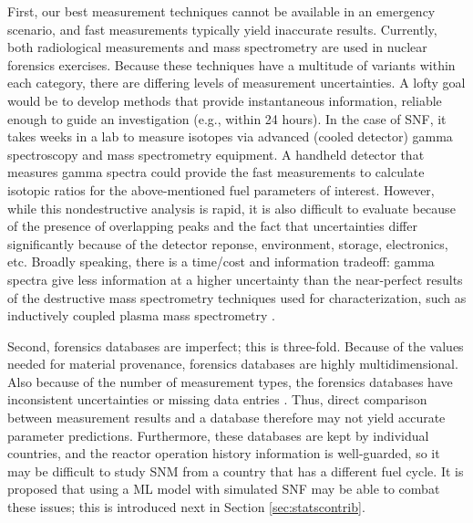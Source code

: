 First, our best measurement techniques cannot be available in an emergency
scenario, and fast measurements typically yield inaccurate results.  Currently,
both radiological measurements and mass spectrometry are used in nuclear
forensics exercises.  Because these techniques have a multitude of variants
within each category, there are differing levels of measurement uncertainties.
A lofty goal would be to develop methods that provide instantaneous
information, reliable enough to guide an investigation (e.g., within 24 hours).
In the case of \gls{SNF}, it takes weeks in a lab to measure isotopes via
advanced (cooled detector) gamma spectroscopy and mass spectrometry equipment.
A handheld detector that measures gamma spectra could provide the fast
measurements to calculate isotopic ratios for the above-mentioned fuel
parameters of interest.  However, while this nondestructive analysis is rapid,
it is also difficult to evaluate because of the presence of overlapping peaks
and the fact that uncertainties differ significantly because of the detector
reponse, environment, storage, electronics, etc. Broadly speaking, there is a
time/cost and information tradeoff: gamma spectra give less information at a
higher uncertainty than the near-perfect results of the destructive mass
spectrometry techniques used for characterization, such as inductively coupled
plasma mass spectrometry \cite{iaea_nf}.

Second, forensics databases are imperfect; this is three-fold.  Because of the
values needed for material provenance, forensics databases are highly
multidimensional. Also because of the number of measurement types, the
forensics databases have inconsistent uncertainties or missing data entries
\cite{nf_missingdata}.  Thus, direct comparison between measurement results and
a database therefore may not yield accurate parameter predictions.
Furthermore, these databases are kept by individual countries, and the reactor
operation history information is well-guarded, so it may be difficult to study
\gls{SNM} from a country that has a different fuel cycle.  It is proposed that
using a \gls{ML} model with simulated \gls{SNF} may be able to combat
these issues; this is introduced next in Section \ref{sec:statscontrib}. 

